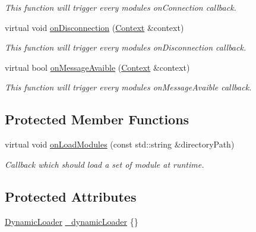 \begin{DoxyCompactItemize}
\begin{DoxyCompactList}\small\item\em This function will trigger every module\textquotesingle{}s \textquotesingle{}on\+Connection\textquotesingle{} callback. \end{DoxyCompactList}\item 
virtual void \mbox{\hyperlink{classo_z_1_1_pipeline_a4245ad0f1fb310cf19986dbaf0bff3d2}{on\+Disconnection}} (\mbox{\hyperlink{classo_z_1_1_context}{Context}} \&context)
\begin{DoxyCompactList}\small\item\em This function will trigger every module\textquotesingle{}s \textquotesingle{}on\+Disconnection\textquotesingle{} callback. \end{DoxyCompactList}\item 
virtual bool \mbox{\hyperlink{classo_z_1_1_pipeline_a5dc5181a699312bc35384ad706668e3c}{on\+Message\+Avaible}} (\mbox{\hyperlink{classo_z_1_1_context}{Context}} \&context)
\begin{DoxyCompactList}\small\item\em This function will trigger every module\textquotesingle{}s \textquotesingle{}on\+Message\+Avaible\textquotesingle{} callback. \end{DoxyCompactList}\end{DoxyCompactItemize}
\subsection*{Protected Member Functions}
\begin{DoxyCompactItemize}
\item 
virtual void \mbox{\hyperlink{classo_z_1_1_pipeline_a0265d90a5540e69b25069d5d96973c53}{on\+Load\+Modules}} (const std\+::string \&directory\+Path)
\begin{DoxyCompactList}\small\item\em Callback which should load a set of module at runtime. \end{DoxyCompactList}\end{DoxyCompactItemize}
\subsection*{Protected Attributes}
\begin{DoxyCompactItemize}
\item 
\mbox{\hyperlink{classo_z_1_1_dynamic_loader}{Dynamic\+Loader}} \mbox{\hyperlink{classo_z_1_1_pipeline_a6412859211177d78f0eebcecda79e841}{\+\_\+dynamic\+Loader}} \{\}
\end{DoxyCompactItemize}



